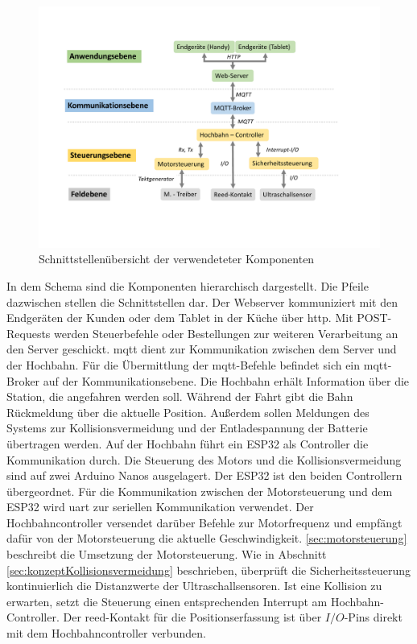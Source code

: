 \begin{figure}[h]
	\centering
	\includegraphics[width=16cm]{schnittstellen.pdf}
	\caption{Schnittstellenübersicht der verwendeteter Komponenten}
	\label{pic:schnittstellen}
\end{figure}

In dem Schema sind die Komponenten hierarchisch dargestellt. Die Pfeile dazwischen stellen die Schnittstellen dar. Der Webserver kommuniziert mit den Endgeräten der Kunden oder dem Tablet in der Küche über \acrshort{http}. Mit POST-Requests werden Steuerbefehle oder Bestellungen zur weiteren Verarbeitung an den Server geschickt.
\acrshort{mqtt} dient zur Kommunikation zwischen dem Server und der Hochbahn. Für die Übermittlung der \acrshort{mqtt}-Befehle  befindet sich ein \acrshort{mqtt}-Broker auf der Kommunikationsebene. Die Hochbahn erhält Information über die Station, die angefahren werden soll. Während der Fahrt gibt die Bahn Rückmeldung über die aktuelle Position. Außerdem sollen Meldungen des Systems zur Kollisionsvermeidung und der Entladespannung der Batterie übertragen werden. Auf der Hochbahn führt ein ESP32 als Controller die Kommunikation durch. Die Steuerung des Motors und die Kollisionsvermeidung sind auf zwei Arduino Nanos ausgelagert. Der ESP32 ist den beiden Controllern übergeordnet. Für die Kommunikation zwischen der Motorsteuerung und dem ESP32 wird \acrshort{uart} zur seriellen Kommunikation verwendet. Der Hochbahncontroller versendet darüber Befehle zur Motorfrequenz und empfängt dafür von der Motorsteuerung die aktuelle Geschwindigkeit. \autoref{sec:motorsteuerung} beschreibt die Umsetzung der Motorsteuerung. Wie in Abschnitt \ref{sec:konzeptKollisionsvermeidung} beschrieben, überprüft die Sicherheitssteuerung kontinuierlich die Distanzwerte der Ultraschallsensoren. Ist eine Kollision zu erwarten, setzt die Steuerung einen entsprechenden Interrupt am Hochbahn-Controller. Der \acrshort{reed}-Kontakt für die Positionserfassung ist über $I/O$-Pins direkt mit dem Hochbahncontroller verbunden. 

